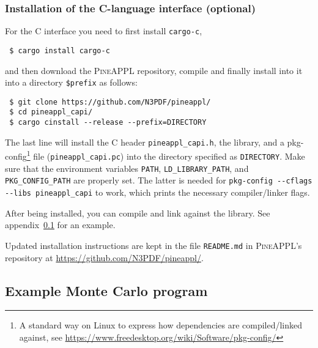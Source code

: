 \subsubsection*{Installation of the C-language interface (optional)}

For the C interface you need to first install \texttt{cargo-c},
\begin{verbatim}
 $ cargo install cargo-c
\end{verbatim}
and then download the \textsc{PineAPPL} repository, compile and finally install into it into a directory \texttt{\$prefix} as follows:
\begin{verbatim}
 $ git clone https://github.com/N3PDF/pineappl/
 $ cd pineappl_capi/
 $ cargo cinstall --release --prefix=DIRECTORY
\end{verbatim}
The last line will install the C header \texttt{pineappl\_capi.h}, the library, and a pkg-config\footnote{A standard way on Linux to express how dependencies are compiled/linked against, see \url{https://www.freedesktop.org/wiki/Software/pkg-config/}} file (\texttt{pineappl\_capi.pc}) into the directory specified as \texttt{DIRECTORY}.
Make sure that the environment variables \texttt{PATH}, \texttt{LD\_LIBRARY\_PATH}, and \texttt{PKG\_CONFIG\_PATH} are properly set.
The latter is needed for \texttt{pkg-config -{}-cflags -{}-libs pineappl\_capi} to work, which prints the necessary compiler/linker flags.

After being installed, you can compile and link against the library.
See appendix~\ref{app:example-program} for an example.

Updated installation instructions are kept in the file \texttt{README.md} in \textsc{PineAPPL}'s repository at \url{https://github.com/N3PDF/pineappl/}.

\subsection{Example Monte Carlo program}
\label{app:example-program}




